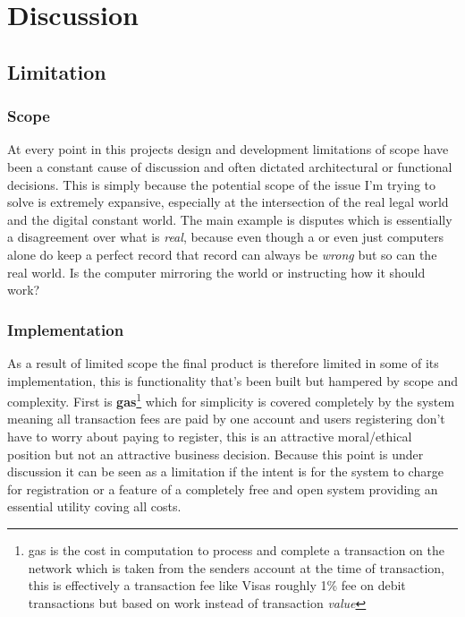 \section{Discussion}
\subsection{Limitation}

\subsubsection{Scope}

At every point in this projects design and development limitations of scope have been a constant cause of discussion and often dictated architectural or functional decisions. This is simply because the potential scope of the issue I'm trying to solve is extremely expansive, especially at the intersection of the real legal world and the digital constant world. The main example is disputes which is essentially a disagreement over what is \textit{real}, because even though a  or even just computers alone do keep a perfect record that record can always be \textit{wrong} but so can the real world. Is the computer mirroring the world or instructing how it should work?

\subsubsection{Implementation}

As a result of limited scope the final product is therefore limited in some of its implementation, this is functionality that's been built but hampered by scope and complexity. First is \textbf{gas}\footnote{gas is the cost in computation to process and complete a transaction on the  network which is taken from the senders account at the time of transaction, this is effectively a transaction fee like Visas roughly 1\% fee on debit transactions but based on work instead of transaction \textit{value}} which for simplicity is covered completely by the system meaning all transaction fees are paid by one account and users registering don't have to worry about paying to register, this is an attractive moral/ethical position but not an attractive business decision. Because this point is under discussion it can be seen as a limitation if the intent is for the system to charge for registration or a feature of a completely free and open system providing an essential utility coving all costs.

